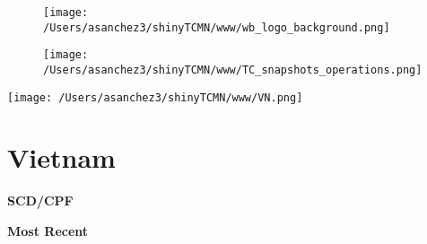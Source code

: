 \documentclass{article}\usepackage[]{graphicx}\usepackage[]{color}
\begin{document}
\newpage
\begin{figure}
  \vspace{-3ex} %
  \hspace{-7ex} %
  \texttt{[image: /Users/asanchez3/shinyTCMN/www/wb\_logo\_background.png]}
\end{figure}
\begin{figure}
  \begin{minipage}[t]{0.99\textwidth} %
      \vspace{-30ex}
      \hspace{-2ex}
      \raggedright{\texttt{[image: /Users/asanchez3/shinyTCMN/www/TC\_snapshots\_operations.png]}}
  \end{minipage}
\end{figure}
%
\begin{minipage}[t]{0.99\textwidth} %
  \vspace{-1.5cm}
  \begin{minipage}[c]{0.36\textwidth} 
    \begin{minipage}[c]{0.28\textwidth} %
      \texttt{[image: /Users/asanchez3/shinyTCMN/www/VN.png]}
    \end{minipage}
    \begin{minipage}[c]{0.70\textwidth} %
      \section*{\color{blue!40!black}Vietnam}
    \end{minipage}
  \end{minipage}
  \begin{minipage}[c]{0.63\textwidth}
  \end{minipage}  
\end{minipage} %

  \raggedright{\color{white!30!blue} \textbf{\Large SCD/CPF}}
    \begin{minipage}[c]{0.99\textwidth}  
      \vspace*{0.2cm}
      \raggedright{\color{white!30!blue} \textbf{\large Most Recent}}
      \vspace*{0.3cm}
      

      \vspace*{0.5cm}
    \end{minipage}
    
\end{document}

